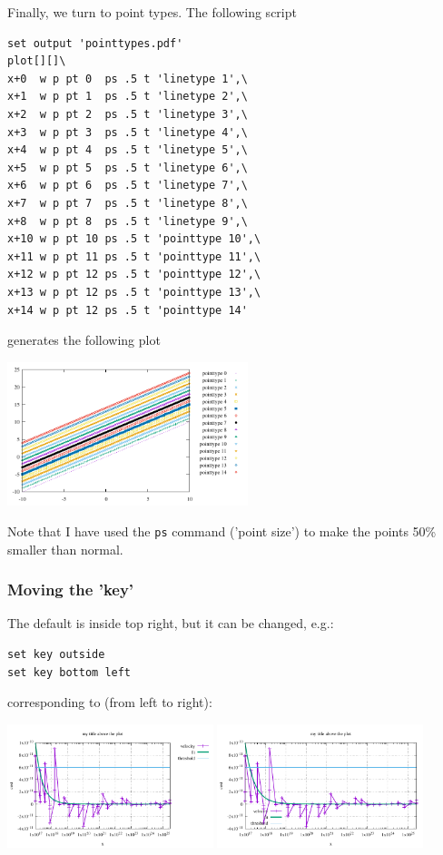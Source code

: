 Finally, we turn to point types.
The following script
\begin{verbatim}
set output 'pointtypes.pdf'
plot[][]\
x+0  w p pt 0  ps .5 t 'linetype 1',\
x+1  w p pt 1  ps .5 t 'linetype 2',\
x+2  w p pt 2  ps .5 t 'linetype 3',\
x+3  w p pt 3  ps .5 t 'linetype 4',\
x+4  w p pt 4  ps .5 t 'linetype 5',\
x+5  w p pt 5  ps .5 t 'linetype 6',\
x+6  w p pt 6  ps .5 t 'linetype 7',\
x+7  w p pt 7  ps .5 t 'linetype 8',\
x+8  w p pt 8  ps .5 t 'linetype 9',\
x+10 w p pt 10 ps .5 t 'pointtype 10',\
x+11 w p pt 11 ps .5 t 'pointtype 11',\
x+12 w p pt 12 ps .5 t 'pointtype 12',\
x+13 w p pt 12 ps .5 t 'pointtype 13',\
x+14 w p pt 12 ps .5 t 'pointtype 14' 
\end{verbatim}
generates the following plot
\begin{center}
\includegraphics[width=7cm]{images/gnuplot/pointtypes.pdf}
\end{center}
Note that I have used the {\tt ps} command ('point size') to make the points 50\% smaller 
than normal. 


\subsubsection*{Moving the 'key'}

The default is inside top right, but it can be changed, e.g.:
\begin{verbatim}
set key outside
set key bottom left
\end{verbatim}
corresponding to (from left to right):
\begin{center}
\includegraphics[width=6cm]{images/gnuplot/results_d.pdf}
\includegraphics[width=6cm]{images/gnuplot/results_e.pdf}
\end{center}


